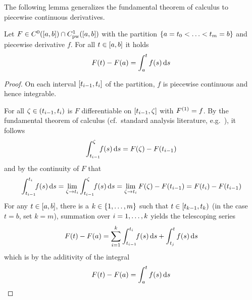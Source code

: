     The following lemma generalizes the fundamental theorem of calculus to piecewise continuous derivatives.

    \begin{lemma}[]\label{lm:pc-hauptsatz}
        Let $F\in\Cn[0]{\compactum{a}{b}}{} \cap \Cnpw[1]{\compactum{a}{b}}{}$ with the partition $\partition{a=t_0}{t_m=b}$ and piecewise derivative $f$.
        For all $t\in\compactum{a}{b}$ it holds
        \begin{equation*}
            F(t)-F(a) = \integral{a}{t} f(s)\dx[s]
        \end{equation*}
    \end{lemma}
    \begin{proof}
        On each interval $\compactum{t_{i-1}}{t_i}$ of the partition, $f$ is piecewise continuous and hence integrable.

        For all $\zeta\in\open{t_{i-1}}{t_i}$ is $F$ differentiable on $\compactum{t_{i-1}}{\zeta}$ with $\D{F}=f$.
        By the fundamental theorem of calculus (cf.\ standard analysis literature, e.g.~\cite{Gathmann12GDM,Rudin76PrinciplesAnalysis}), it follows
        \begin{equation*}
            \denseintegral{t_{i-1}}{\zeta} f(s)\dx[s] = F(\zeta)-F(t_{i-1})
        \end{equation*}
        and by the continuity of $F$ that
        \begin{equation*}
            \denseintegral{t_{i-1}}{t_i} f(s)\dx[s]
            = \lim_{\zeta\to t_i}\denseintegral{t_{i-1}}{\zeta} f(s)\dx[s]
            = \lim_{\zeta\to t_i} F(\zeta)-F(t_{i-1})
            = F(t_i)-F(t_{i-1})
        \end{equation*}
        For any $t\in\compactum{a}{b}$, there is a $k\in\set{\range{1}{m}}$ such that $t\in\closedopen{t_{k-1}}{t_k}$ (in the case $t=b$, set $k=m$), summation over $i=\range{1}{k}$ yields the telescoping series
        \begin{equation*}
            F(t)-F(a) = \sum_{i=1}^{k} \denseintegral{t_{i-1}}{t_i} f(s)\dx[s] + \integral{t_j}{t} f(s)\dx[s]
        \end{equation*}
        which is by the additivity of the integral
        \begin{equation*}
            F(t)-F(a) = \integral{a}{t} f(s)\dx[s]
        \end{equation*}
    \end{proof}

